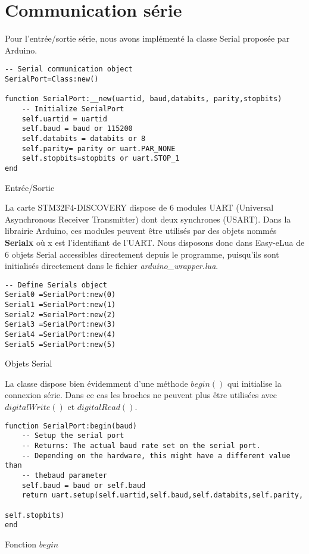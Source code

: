 \section{Communication série}

Pour l'entrée/sortie série, nous avons implémenté la classe Serial proposée par Arduino.

\begin{table}[h]
\begin{lstlisting}
-- Serial communication object
SerialPort=Class:new()

function SerialPort:__new(uartid, baud,databits, parity,stopbits)
    -- Initialize SerialPort
    self.uartid = uartid
    self.baud = baud or 115200
    self.databits = databits or 8
    self.parity= parity or uart.PAR_NONE
    self.stopbits=stopbits or uart.STOP_1
end
\end{lstlisting}
\caption{Entrée/Sortie}
\end{table}

La carte STM32F4-DISCOVERY dispose de 6 modules UART (Universal Asynchronous Receiver Transmitter) dont deux synchrones (USART).
 Dans la librairie Arduino, ces modules peuvent être utilisés par des objets nommés \textbf{Serialx} où x est l’identifiant de l’UART. 
Nous disposons donc dans Easy-eLua de 6 objets Serial accessibles directement depuis le programme, puisqu’ils sont initialisés 
directement dans le fichier \textit{arduino\_wrapper.lua}.

\begin{table}[h]
\begin{lstlisting}
-- Define Serials object
Serial0 =SerialPort:new(0)
Serial1 =SerialPort:new(1)
Serial2 =SerialPort:new(2)
Serial3 =SerialPort:new(3)
Serial4 =SerialPort:new(4)
Serial5 =SerialPort:new(5)
\end{lstlisting}
\caption{Objets Serial}
\end{table}

\newpage
La classe dispose bien évidemment d’une méthode $begin()$
qui initialise la connexion série. Dans ce cas les broches ne peuvent plus être utilisées avec $digitalWrite()$ et $digitalRead()$.

\begin{table}[h]
\begin{lstlisting}
function SerialPort:begin(baud)
    -- Setup the serial port
    -- Returns: The actual baud rate set on the serial port.
    -- Depending on the hardware, this might have a different value than
    -- thebaud parameter
    self.baud = baud or self.baud
    return uart.setup(self.uartid,self.baud,self.databits,self.parity,
                                                          self.stopbits)
end
\end{lstlisting}
\caption{Fonction $begin$}
\end{table}

